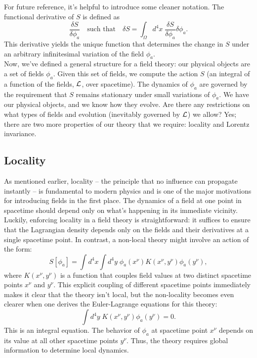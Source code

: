 \noindent For future reference, it's helpful to introduce some cleaner notation. The functional derivative of $S$ is defined as 
\[
    \frac{\delta S}{\delta \phi_a} \quad \text{such that} \quad \delta S = \int_\Omega d^4x\; \frac{\delta S}{\delta \phi_a}\delta\phi_a.
\]
This derivative yields the unique function that determines the change in $S$ under an arbitrary infinitesimal variation of the field $\phi_a$. \\

\noindent Now, we've defined a general structure for a field theory: our physical objects are a set of fields $\phi_a$. Given this set of fields, we compute the action $S$ (an integral of a function of the fields, $\mathcal{L}$, over spacetime). The dynamics of $\phi_a$ are governed by the requirement that $S$ remains stationary under small variations of $\phi_a$. We have our physical objects, and we know how they evolve. Are there any restrictions on what types of fields and evolution (inevitably governed by $\mathcal{L}$) we allow? Yes; there are two more properties of our theory that we require: locality and Lorentz invariance.
\subsection{Locality}
As mentioned earlier, locality -- the principle that no influence can propagate instantly -- is fundamental to modern physics and is one of the major motivations for introducing fields in the first place. The dynamics of a field at one point in spacetime should depend only on what's happening in its immediate vicinity.\\

\noindent Luckily, enforcing locality in a field theory is straightforward: it suffices to ensure that the Lagrangian density depends only on the fields and their derivatives at a single spacetime point. In contrast, a non-local theory might involve an action of the form:
\[
    S[\phi_a] = \int d^4x\int d^4y \; \phi_a(x^\nu)K(x^\nu, y^\nu)\phi_a(y^\nu),
\]
where $K(x^\nu,y^\nu)$ is a function that couples field values at two distinct spacetime points $x^\nu$ and $y^\nu$. This explicit coupling of different spacetime points immediately makes it clear that the theory isn't local, but the non-locality becomes even clearer when one derives the Euler-Lagrange equations for this theory:
\[
    \int d^4y\; K(x^\nu, y^\nu)\phi_a(y^\nu) = 0.
\]
This is an integral equation. The behavior of $\phi_a$ at spacetime point $x^\nu$ depends on its value at all other spacetime points $y^\nu$. Thus, the theory requires global information to determine local dynamics. \\

